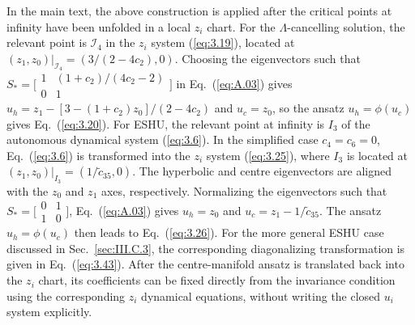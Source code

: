 \documentclass[aps,prd,twocolumn]{revtex4-2}
\begin{document}
In the main text, the above construction is applied after the critical points at infinity have been unfolded in a local $z_i$ chart. For the $\Lambda$-cancelling solution, the relevant point is $\mathcal{I}_4$ in the $z_i$ system (\ref{eq:3.19}), located at $(z_{1},z_{0})|_{\mathcal{I}_4}=(3/(2-4c_2),0)$. Choosing the eigenvectors such that 
$S_\ast=\big[\begin{smallmatrix}
  1 & (1+c_2)/(4c_2-2) \\
  0 & 1
\end{smallmatrix}\big]$ in Eq.~(\ref{eq:A.03}) gives $u_h=z_1-[3-(1+c_2)z_0]/(2-4c_2)$ and $u_c=z_0$, so the ansatz $u_h=\phi(u_c)$ gives Eq.~(\ref{eq:3.20}). For ESHU, the relevant point at infinity is $I_3$ of the autonomous dynamical system (\ref{eq:3.6}). In the simplified case $c_4=c_6=0$, Eq.~(\ref{eq:3.6}) is transformed into the $z_i$ system (\ref{eq:3.25}), where $I_3$ is located at $(z_1,z_0)|_{I_3} = (1/\tilde{c}_{35},0)$. The hyperbolic and centre eigenvectors are aligned with the $z_0$ and $z_1$ axes, respectively. Normalizing the eigenvectors such that $S_\ast=\big[\begin{smallmatrix}
  0 & 1 \\
  1 & 0
\end{smallmatrix}\big]$, Eq.~(\ref{eq:A.03}) gives $u_h=z_0$ and $u_c=z_1-1/\tilde{c}_{35}$. The ansatz $u_h=\phi(u_c)$ then leads to Eq.~(\ref{eq:3.26}). For the more general ESHU case discussed in Sec.~\ref{sec:III.C.3}, the corresponding diagonalizing transformation is given in Eq.~(\ref{eq:3.43}). After the centre-manifold ansatz is translated back into the $z_i$ chart, its coefficients can be fixed directly from the invariance condition using the corresponding $z_i$ dynamical equations, without writing the closed $u_i$ system explicitly.
\end{document}
